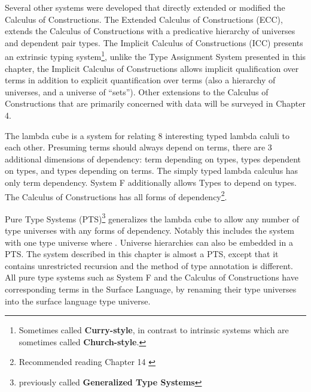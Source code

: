 Several other systems were developed that directly extended or modified the Calculus of Constructions.
The Extended Calculus of Constructions (\ac{ECC})\cite{luo1990extended,luo1994computation}, extends the Calculus of Constructions with a predicative hierarchy of universes and dependent pair types.
The Implicit Calculus of Constructions (\ac{ICC})\cite{10.1007/3-540-45413-6_27,10.1007/978-3-540-78499-9_26} presents an extrinsic typing system\footnote{
  Sometimes called \textbf{Curry-style}, in contrast to intrinsic systems which are sometimes called \textbf{Church-style}.
  }, unlike the Type Assignment System presented in this chapter, the Implicit Calculus of Constructions allows implicit qualification over terms in addition to explicit quantification over terms (also a hierarchy of universes, and a universe of ``sets'').
Other extensions to the Calculus of Constructions that are primarily concerned with data will be surveyed in Chapter 4.

The lambda cube is a system for relating 8 interesting typed lambda caluli to each other.
Presuming terms should always depend on terms, there are 3 additional dimensions of dependency: term depending on types, types dependent on types, and types depending on terms.
The simply typed lambda calculus has only term dependency.
System F additionally allows Types to depend on types.
The Calculus of Constructions has all forms of dependency\footnote{Recommended reading Chapter 14 \cite{sorensen2006lectures}}.

Pure Type Systems (\ac{PTS})\footnote{previously called \textbf{Generalized Type Systems}} generalizes the lambda cube to allow any number of type universes with any forms of dependency.
Notably this includes the system with one type universe where \tit{}.
Universe hierarchies can also be embedded in a \ac{PTS}.
The system described in this chapter is almost a \ac{PTS}, except that it contains unrestricted recursion and the method of type annotation is different.
All pure type systems such as System F and the Calculus of Constructions have corresponding terms in the Surface Language, by renaming their type universes into the surface language type universe.


